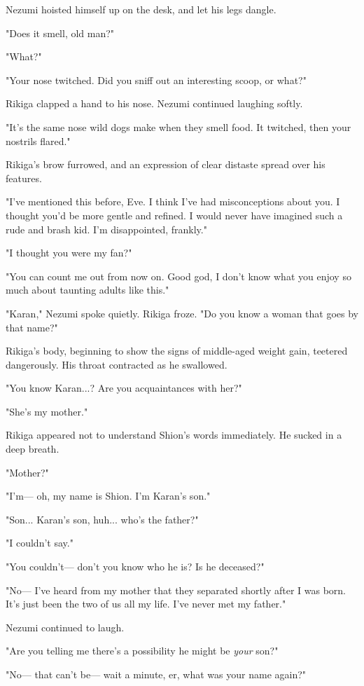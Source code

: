 Nezumi hoisted himself up on the desk, and let his legs dangle.

"Does it smell, old man?"

"What?"

"Your nose twitched. Did you sniff out an interesting scoop, or what?"

Rikiga clapped a hand to his nose. Nezumi continued laughing softly.

"It's the same nose wild dogs make when they smell food. It twitched,
then your nostrils flared."

Rikiga's brow furrowed, and an expression of clear distaste spread over
his features.

"I've mentioned this before, Eve. I think I've had misconceptions about
you. I thought you'd be more gentle and refined. I would never have
imagined such a rude and brash kid. I'm disappointed, frankly."

"I thought you were my fan?"

"You can count me out from now on. Good god, I don't know what you enjoy
so much about taunting adults like this."

"Karan," Nezumi spoke quietly. Rikiga froze. "Do you know a woman that
goes by that name?"

Rikiga's body, beginning to show the signs of middle-aged weight gain,
teetered dangerously. His throat contracted as he swallowed.

"You know Karan...? Are you acquaintances with her?"

"She's my mother."

Rikiga appeared not to understand Shion's words immediately. He sucked
in a deep breath.

"Mother?"

"I'm--- oh, my name is Shion. I'm Karan's son."

"Son... Karan's son, huh... who's the father?"

"I couldn't say."

"You couldn't--- don't you know who he is? Is he deceased?"

"No--- I've heard from my mother that they separated shortly after I was
born. It's just been the two of us all my life. I've never met my
father."

Nezumi continued to laugh.

"Are you telling me there's a possibility he might be \emph{your} son?"

"No--- that can't be--- wait a minute, er, what was your name again?"

